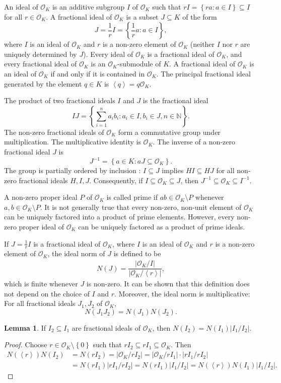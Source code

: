 \documentclass{amsart}
\numberwithin{equation}{section}
\theoremstyle{definition}
\newtheorem{lemma}[theorem]{Lemma}
\theoremstyle{definition}
\def\NN{\mathbb{N}}
\newcommand{\cbr}[1]{ \left\{ {#1} \right\} }
\newcommand{\abr}[1]{\left\langle {#1} \right\rangle}
\newcommand{\OK}{\mathcal{O}_K}
\begin{document}
An ideal of $\OK$ is an additive subgroup $I$ of $\OK$ such that $rI = \cbr{ra:a \in I} \subseteq I$ for all $r \in \OK$. A fractional ideal of $\OK$ is a subset $J \subseteq K$ of the form 
$$J = \frac{1}{r}I = \cbr{\dfrac{1}{r}a : a \in I},$$
where $I$ is an ideal of $\OK$ and $r$ is a non-zero element of $\OK$  (neither $I$ nor $r$ are uniquely determined by $J$).  
Every ideal of $\OK$ is a fractional ideal of $\OK$, and every fractional ideal of $\OK$ is an $\OK$-submodule of $K$. 
A fractional ideal of $\OK$ is an ideal of $\OK$ if and only if it is contained in $\OK$. The principal fractional ideal generated by the element $q \in K$ is $\abr{q} = q\OK$. 

The product of two fractional ideals $I$ and $J$ is the fractional ideal
$$
IJ = \cbr{\sum_{i=1}^{n} a_i b_i : a_i \in I, b_i \in J, n \in \NN}. 
$$
The non-zero fractional ideals of $\OK$ form a commutative group under multiplication.  The multiplicative identity is $\OK$. The inverse of a non-zero fractional ideal $J$ is 
$$
J^{-1} = \cbr{a \in K : aJ \subseteq \OK }. 
$$
The group is partially ordered by inclusion
: $I \subseteq J$ implies $HI \subseteq HJ$ for all non-zero fractional ideals $H,I,J$.  
Consequently, if $I \subseteq \OK \subseteq J$, then $J^{-1} \subseteq \OK \subseteq I^{-1}$. 


A non-zero proper ideal $P$ of $\OK$ is called prime if 
$ab \in \OK \setminus P$ whenever $a,b \in \OK \setminus P$. 
It is not generally true that every non-zero, non-unit element of $\OK$ can be uniquely factored into a product of prime elements. 
However, every non-zero proper ideal of $\OK$ can be uniquely factored 
as a product of prime ideals. 



If $J = \frac{1}{r}I$ is a fractional ideal of $\OK$, where $I$ is an ideal of $\OK$ and $r$ is a non-zero element of $\OK$, the ideal norm of $J$ is defined to be 
\begin{align*}%
N(J) = \dfrac{|\OK/I|}{|\OK/\abr{r}|},    
\end{align*}
which is finite whenever $J$ is non-zero. 
It can be shown that this definition does not depend on the choice of $I$ and $r$. Moreover, the ideal norm is multiplicative: 
For all fractional ideals $J_1,J_2$ of $\OK$, 
$$N(J_1 J_2) = N(J_1)N(J_2).$$ 


\begin{lemma}\label{idealquotient}
If $I_2 \subseteq I_1$ are fractional ideals of $\OK$,  
then  $N(I_2) = N(I_1)|I_1/I_2|$. 
\end{lemma}
\begin{proof}
Choose $r \in \OK \setminus \cbr{0}$ such that $rI_2 \subseteq rI_1 \subseteq \OK$. 
Then 
\begin{align*}
N(\abr{r}) N(I_2)
&=
N(r I_2)
=
|\OK/rI_2|
=
|\OK/rI_1| \cdot |rI_1/rI_2| \\
&=
N(r I_1) |rI_1/rI_2|
=
N(r I_1) |I_1/I_2| 
=
N(\abr{r}) N(I_1) |I_1/I_2|. 
\end{align*}
\end{proof}
\end{document}

